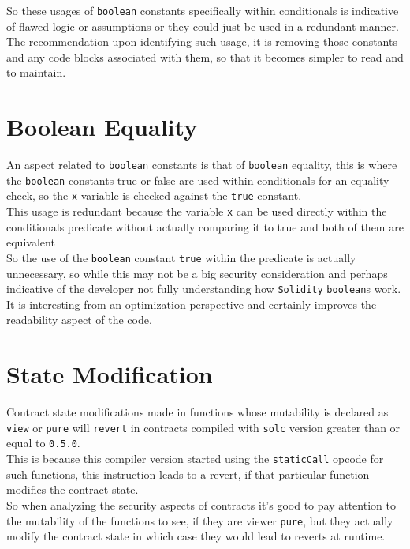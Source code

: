 So these usages of \texttt{boolean} constants specifically within conditionals is indicative of flawed logic or assumptions or they could just be used in a redundant manner. The recommendation upon identifying such usage, it is removing those constants and any code blocks associated with them, so that it becomes simpler to read and to maintain.

\section{Boolean Equality}

An aspect related to \texttt{boolean} constants is that of \texttt{boolean} equality, this is where the \texttt{boolean} constants true or false are used within conditionals for an equality check, so the \texttt{x} variable is checked against the \texttt{true} constant.\\

This usage is redundant because the variable \texttt{x} can be used directly within the conditionals predicate without actually comparing it to true and both of them are equivalent\\

So the use of the \texttt{boolean} constant \texttt{true} within the predicate is actually unnecessary, so while this may not be a big security consideration and perhaps indicative of the developer not fully understanding how \texttt{Solidity} \texttt{boolean}s work. \\

It is interesting from an optimization perspective and certainly improves the readability aspect of the code.

\section{State Modification}

Contract state modifications made in functions whose mutability is declared as \texttt{view}  or \texttt{pure} will \texttt{revert} in contracts compiled with \texttt{solc} version greater than or equal to \texttt{0.5.0}.\\

This is because this compiler version started using the \texttt{staticCall} opcode for such functions, this instruction leads to a revert, if that particular function modifies the contract state.\\

So when analyzing the security aspects of contracts it's good to pay attention to the mutability of the functions to see, if they are viewer \texttt{pure}, but they actually modify the contract state in which case they would lead to reverts at runtime.

